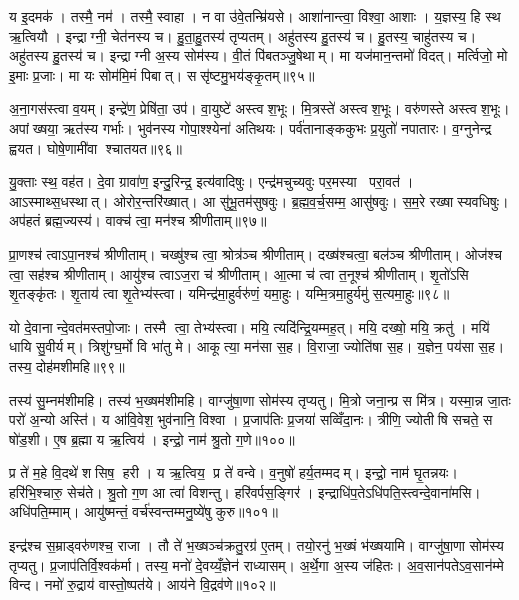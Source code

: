 य इ॒दमक॑। तस्मै॒ नम॑। तस्मै॒ स्वाहा। न वा उ॑वे॒तन्म्रि॑यसे। आशा॑नान्त्वा॒ विश्वा॒ आशाः। य॒ज्ञस्य॒ हि स्थ ऋ॒त्वियौ। इन्द्राग्नी॒ चेत॑नस्य च। हु॒ता॒हु॒तस्य॑ तृप्यतम्। अहु॑तस्य हु॒तस्य॑ च। हु॒तस्य॒ चाहु॑तस्य च। अहु॑तस्य हु॒तस्य॑ च। इन्द्राग्नी अ॒स्य सोम॑स्य। वी॒तं पि॑बतञ्जु॒षेथाम्। मा यज॑मान॒न्तमो॑ विदत्। मर्त्विजो॒ मो इ॒माः प्र॒जाः। मा यः सोम॑मि॒मं पिबात्। ससृ॑ष्टमु॒भय॑ङ्कृ॒तम्॥९५॥\anuvakamend[कृ॒धि॒ मी॒ढुषेऽहु॑तस्य च स॒प्त च॑]

अ॒ना॒गस॑स्त्वा व॒यम्। इन्द्रे॑ण॒ प्रेषि॑ता॒ उप॑। वा॒युष्टे॑ अस्त्वश॒भूः। मि॒त्रस्ते॑ अस्त्वश॒भूः। वरु॑णस्ते अस्त्वश॒भूः। अपांख्षया॒ ऋत॑स्य गर्भाः। भुव॑नस्य गोपा॒श्श्येना॑ अतिथयः। पर्व॑तानाङ्ककुभः प्र॒युतो॑ नपातारः। व॒ग्नुनेन्द्र ह्वयत। घोषे॒णामी॑वा श्चातयत॥९६॥

यु॒क्ताः स्थ॒ वह॑त। दे॒वा ग्रावा॑ण॒ इन्दु॒रिन्द्र॒ इत्य॑वादिषुः। एन्द्र॑मचुच्यवुः पर॒मस्या परा॒वत॑। आऽस्माथ्स॒धस्थात्। ओरोर॒न्तरि॑ख्षात्। आ सु॑भू॒तम॑सुषवुः। ब्र॒ह्म॒व॒र्च॒सम्म॒ आसु॑षवुः। स॒म॒रे रख्षास्यवधिषुः। अप॑हतं ब्रह्म॒ज्यस्य॑। वाक्च॑ त्वा॒ मन॑श्च श्रीणीताम्॥९७॥

प्रा॒णश्च॑ त्वाऽपा॒नश्च॑ श्रीणीताम्। चख्षु॑श्च त्वा॒ श्रोत्र॑ञ्च श्रीणीताम्। दख्ष॑श्चत्वा॒ बल॑ञ्च श्रीणीताम्। ओज॑श्च त्वा॒ सह॑श्च श्रीणीताम्। आयु॑श्च त्वाऽज॒रा च॑ श्रीणीताम्। आ॒त्मा च॑ त्वा त॒नूश्च॑ श्रीणीताम्। शृ॒तो॑ऽसि शृ॒तङ्कृ॑तः। शृ॒ताय॑ त्वा शृ॒तेभ्य॑स्त्वा। यमिन्द्र॑मा॒हुर्वरु॑णं॒ यमा॒हुः। यम्मि॒त्रमा॒हुर्यमु॑ स॒त्यमा॒हुः॥९८॥

यो दे॒वानान्दे॒वत॑मस्तपो॒जाः। तस्मै त्वा॒ तेभ्य॑स्त्वा। मयि॒ त्यदि॑न्द्रि॒यम्मह॒त्। मयि॒ दख्षो॒ मयि॒ क्रतु॑। मयि॑ धायि सु॒वीर्यम्। त्रिशु॑ग्घ॒र्मो वि भा॑तु मे। आकूत्या॒ मन॑सा स॒ह। वि॒राजा॒ ज्योति॑षा स॒ह। य॒ज्ञेन॒ पय॑सा स॒ह। तस्य॒ दोह॑मशीमहि॥९९॥

तस्य॑ सु॒म्नम॑शीमहि। तस्य॑ भ॒ख्षम॑शीमहि। वाग्जु॑षा॒णा सोम॑स्य तृप्यतु। मि॒त्रो जना॒न्प्र स मि॑त्र। यस्मा॒न्न जा॒तः परो॑ अ॒न्यो अस्ति॑। य आ॑वि॒वेश॒ भुव॑नानि॒ विश्वा। प्र॒जाप॑तिः प्र॒जया॑ सव्विँदा॒नः। त्रीणि॒ ज्योतीषि सचते॒ स षो॑ड॒शी। ए॒ष ब्र॒ह्मा य ऋ॒त्विय॑। इन्द्रो॒ नाम॑ श्रु॒तो ग॒णे॥१००॥

प्र ते॑ म॒हे वि॒दथे॑ शसिष॒ हरी। य ऋ॒त्विय॒ प्र ते॑ वन्वे। व॒नुषो॑ हर्य॒तम्मदम्। इन्द्रो॒ नाम॑ घृ॒तन्नयः। हरि॑भि॒श्चारु॒ सेच॑ते। श्रु॒तो ग॒ण आ त्वा॑ विशन्तु। हरि॑वर्पस॒ङ्गिर॑। इन्द्राधि॑प॒तेऽधि॑पति॒स्त्वन्दे॒वाना॑मसि। अधि॑पति॒म्माम्। आयु॑ष्मन्तं॒ वर्च॑स्वन्तम्मनु॒ष्ये॑षु कुरु॥१०१॥

इन्द्र॑श्च स॒म्राड्वरु॑णश्च॒ राजा। तौ ते॑ भ॒ख्षञ्च॑क्रतु॒रग्र॑ ए॒तम्। तयो॒रनु॑ भ॒ख्षं भ॑ख्षयामि। वाग्जु॑षा॒णा सोम॑स्य तृप्यतु। प्र॒जाप॑तिर्वि॒श्वक॑र्मा। तस्य॒ मनो॑ दे॒वय्यँ॒ज्ञेन॑ राध्यासम्। अ॒र्थे॒गा अ॒स्य ज॑हितः। अ॒व॒सान॑पतेऽव॒सान॑म्मे विन्द। नमो॑ रु॒द्राय॑ वास्तो॒ष्पत॑ये। आय॑ने वि॒द्रव॑णे॥१०२॥

